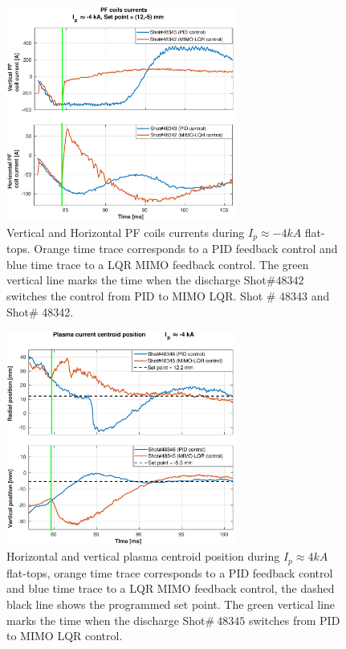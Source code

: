 \begin{figure}
	\centering
	\includegraphics[width=0.67\textwidth]{Chp5/PIDvsMIMO_343_342_curr_2.eps}
	\caption{ Vertical and Horizontal PF coils currents during  $I_p\approx -4kA$  flat-tops. Orange time trace corresponds to a PID feedback control and blue time trace to a LQR MIMO feedback control. The green vertical line marks the time  when the  discharge Shot$\# 48342$ switches the control from PID to MIMO LQR. Shot $\#$ 48343 and Shot$\#$ 48342.}
\end{figure}

\begin{figure}
	\centering
	\includegraphics[width=0.67\textwidth]{Chp5/PIDvsMIMO_346_345_2.eps}
	\caption{Horizontal and vertical plasma centroid position during  $I_p\approx 4kA$  flat-tops, orange time trace corresponds to a PID feedback control and blue time trace to a LQR MIMO feedback control, the dashed black line shows the programmed set point. The green vertical line marks the time  when the  discharge Shot$\# ~48345$ switches  from PID to MIMO LQR control.}
\end{figure}

